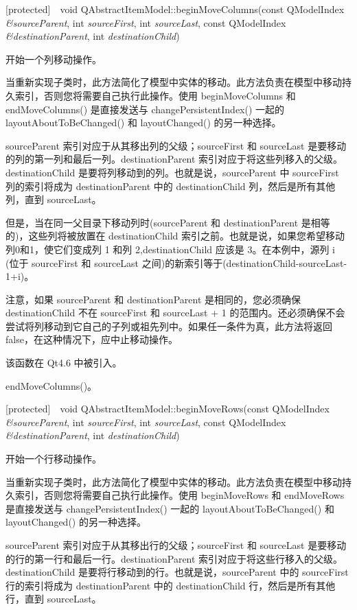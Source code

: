 [protected] void QAbstractItemModel::beginMoveColumns(const QModelIndex \emph{\&sourceParent}, int \emph{sourceFirst}, int \emph{sourceLast}, const QModelIndex \emph{\&destinationParent}, int \emph{destinationChild})

开始一个列移动操作。

当重新实现子类时，此方法简化了模型中实体的移动。此方法负责在模型中移动持久索引，否则您将需要自己执行此操作。使用 beginMoveColumns 和 endMoveColumns() 是直接发送与 changePersistentIndex() 一起的 layoutAboutToBeChanged() 和 layoutChanged() 的另一种选择。

sourceParent 索引对应于从其移出列的父级；sourceFirst 和 sourceLast 是要移动的列的第一列和最后一列。destinationParent 索引对应于将这些列移入的父级。destinationChild 是要将列移动到的列。也就是说，sourceParent 中 sourceFirst 列的索引将成为 destinationParent 中的 destinationChild 列，然后是所有其他列，直到 sourceLast。

但是，当在同一父目录下移动列时(sourceParent 和 destinationParent 是相等的)，这些列将被放置在 destinationChild 索引之前。也就是说，如果您希望移动列0和1，使它们变成列 1 和列 2,destinationChild 应该是 3。在本例中，源列 i (位于 sourceFirst 和 sourceLast 之间)的新索引等于(destinationChild-sourceLast-1+i)。

注意，如果 sourceParent 和 destinationParent 是相同的，您必须确保 destinationChild 不在 sourceFirst 和 sourceLast + 1 的范围内。还必须确保不会尝试将列移动到它自己的子列或祖先列中。如果任一条件为真，此方法将返回 false，在这种情况下，应中止移动操作。

该函数在 Qt4.6 中被引入。

\begin{seeAlso}
endMoveColumns()。
\end{seeAlso}

\splitLine

[protected] void QAbstractItemModel::beginMoveRows(const QModelIndex \emph{\&sourceParent}, int \emph{sourceFirst}, int \emph{sourceLast}, const QModelIndex \emph{\&destinationParent}, int \emph{destinationChild})

开始一个行移动操作。

当重新实现子类时，此方法简化了模型中实体的移动。此方法负责在模型中移动持久索引，否则您将需要自己执行此操作。使用 beginMoveRows 和 endMoveRows 是直接发送与 changePersistentIndex() 一起的 layoutAboutToBeChanged() 和 layoutChanged() 的另一种选择。

sourceParent 索引对应于从其移出行的父级；sourceFirst 和 sourceLast 是要移动的行的第一行和最后一行。destinationParent 索引对应于将这些行移入的父级。destinationChild 是要将行移动到的行。也就是说，sourceParent 中的 sourceFirst 行的索引将成为 destinationParent 中的 destinationChild 行，然后是所有其他行，直到 sourceLast。

